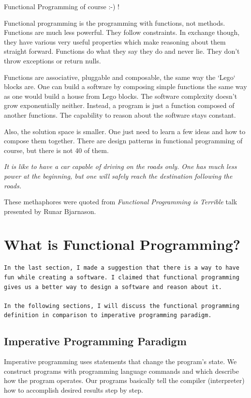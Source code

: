 \documentclass[12pt,twoside,a4paper]{report}
\begin{document}
Functional Programming of course :-) !

Functional programming is the programming with functions, not methods. Functions are much less powerful. They follow constraints. In exchange though, they have various very useful properties which make reasoning
about them straight forward. Functions do what they say they do and never lie. They don't throw exceptions or return nulls.

Functions are associative, pluggable and composable, the same way the `Lego` blocks are. One can build a software by composing simple functions the same way as one would build a house from Lego blocks. The software complexity doesn't grow exponentially neither. Instead, a program is just a function composed of another functions. The capability to reason about the software stays constant.

Also, the solution space is smaller. One just need to learn a few ideas and how to compose them together. There are design patterns in functional programming of course, but there is not 40 of them.

\emph{It is like to have a car capable of driving on the roads only. One has much less power at the beginning, but one will safely reach the destination following the roads.}

These methaphores were quoted from \emph{Functional Programming is Terrible} talk presented by Runar Bjarnason.


\section{What is Functional Programming?}\label{6.3}
\begin{lstlisting}
In the last section, I made a suggestion that there is a way to have fun while creating a software. I claimed that functional programming gives us a better way to design a software and reason about it.

In the following sections, I will discuss the functional programming definition in comparison to imperative programming paradigm.
\end{lstlisting}

\subsection{Imperative Programming Paradigm}\label{6.3.1}

Imperative programming uses statements that change the program's state. We construct programs with programming language commands and which describe how the program operates. Our programs basically tell the compiler (interpreter) how to accomplish desired results step by step.
\end{document}
